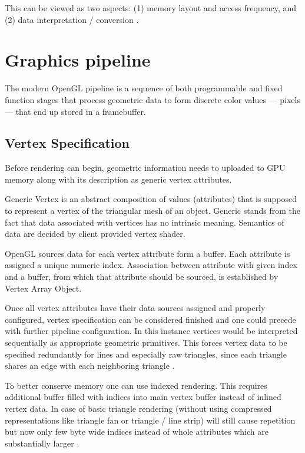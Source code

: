 This can be viewed as two aspects: (1) memory layout and access frequency, and (2) data interpretation / conversion \cite{glwiki}.

\section{Graphics pipeline}
The modern OpenGL pipeline is a sequence of both programmable and fixed function stages that process geometric data to form discrete color values --- pixels --- that end up stored in a framebuffer.

\subsection{Vertex Specification}

Before rendering can begin, geometric information needs to uploaded to GPU memory along with its description as generic vertex attributes.

Generic Vertex is an abstract composition of values (attributes) that is supposed to represent a vertex of the triangular mesh of an object.
Generic stands from the fact that data associated with vertices has no intrinsic meaning.
Semantics of data are decided by client provided vertex shader.

OpenGL sources data for each vertex attribute form a buffer. Each attribute is assigned a unique numeric index.
Association between attribute with given index and a buffer, from which that attribute should be sourced, is established by Vertex Array Object.

Once all vertex attributes have their data sources assigned and properly configured, vertex specification can be considered finished and one could precede with further pipeline configuration.
In this instance vertices would be interpreted sequentially as appropriate geometric primitives. This forces vertex data to be specified redundantly for 
lines and especially raw triangles, since each triangle shares an edge with each neighboring triangle \cite{openglspec}.

To better conserve memory one can use indexed rendering. This requires additional buffer filled with indices into main vertex buffer instead of inlined vertex data.
In case of basic triangle rendering (without using compressed representations like triangle fan or triangle / line strip) 
will still cause repetition but now only few byte wide indices instead of whole attributes which are substantially larger \cite{openglspec}.

